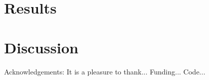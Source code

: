 \documentclass[12pt, preprint]{aastex}
\begin{document}

\section{Results}


\section{Discussion}



\acknowledgements
Acknowledgements:
It is a pleasure to thank...
Funding...
Code...
\end{document}
